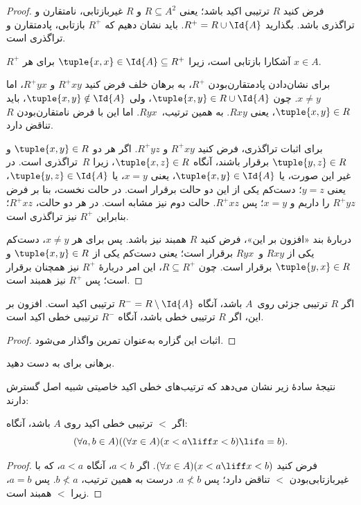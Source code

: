 \documentclass[../../../include/open-logic-section]{subfiles}
\begin{document}
\begin{proof}
فرض کنید $R$ ترتیبی اکید باشد؛ یعنی $R \subseteq A^2$ و $R$
غیربازتابی، نامتقارن و تراگذری باشد. بگذارید $R^+ = R \cup \Id{A}$.
باید نشان دهیم که $R^+$ بازتابی، پادمتقارن و تراگذری است.

$R^+$ آشکارا بازتابی است، زیرا $\tuple{x, x} \in \Id{A} \subseteq
R^+$ برای هر $x \in A$.

برای نشان‌دادن پادمتقارن‌بودن $R^+$، به برهان خلف فرض کنید $R^+xy$ و
$R^+yx$، اما $x \neq y$. چون $\tuple{x,y} \in R \cup \Id{A}$، ولی
$\tuple{x, y} \notin \Id{A}$، باید $\tuple{x, y} \in R$، یعنی
$Rxy$. به همین ترتیب،~$Ryx$. اما این با فرض نامتقارن‌بودن $R$ تناقض
دارد.

برای اثبات تراگذری، فرض کنید $R^+xy$ و $R^+yz$. اگر هر دو
$\tuple{x, y} \in R$ و $\tuple{y,z} \in R$ برقرار باشند، آنگاه $\tuple{x, z} \in
R$، زیرا $R$~تراگذری است. در غیر این صورت، یا $\tuple{x, y} \in
\Id{A}$، یعنی $x = y$، یا $\tuple{y, z} \in \Id{A}$، یعنی $y = z$؛
دست‌کم یکی از این دو حالت برقرار است.
در حالت نخست، بنا بر فرض $R^+yz$ را داریم و $x = y$؛ پس $R^+xz$. حالت
دوم نیز مشابه است. در هر دو حالت، $R^+xz$؛ بنابراین $R^+$ نیز تراگذری
است.

دربارهٔ بند «افزون بر این»، فرض کنید $R$ همبند نیز باشد. پس برای هر
$x \neq y$، دست‌کم یکی از $Rxy$ و~$Ryx$ برقرار است؛ یعنی دست‌کم یکی از
$\tuple{x, y} \in R$ و $\tuple{y, x} \in R$ برقرار است. چون $R \subseteq R^+$، این امر دربارهٔ $R^+$
نیز همچنان برقرار است؛ پس $R^+$ نیز همبند است.
\end{proof}

\begin{prop}
اگر $R$ ترتیبی جزئی روی~$A$ باشد، آنگاه $R^- = R \setminus \Id{A}$
ترتیبی اکید است. افزون بر این، اگر $R$ ترتیبی خطی باشد، آنگاه $R^-$
ترتیبی خطی اکید است.
\end{prop}

\begin{proof}
اثبات این گزاره به‌عنوان تمرین واگذار می‌شود.
\end{proof}

\begin{prob}
برهانی برای  به دست دهید.
\end{prob}

نتیجهٔ سادهٔ زیر نشان می‌دهد که ترتیب‌های خطی اکید خاصیتی شبیه اصل
گسترش دارند:

\begin{prop}
اگر $<$ ترتیبی خطی اکید روی $A$ باشد، آنگاه:
\[
  (\forall a, b \in A)((\forall x \in A)(x < a \liff x < b) \lif a = b).
\]
\end{prop}

\begin{proof}
فرض کنید $(\forall x \in A)(x < a \liff x < b)$. اگر $a < b$، آنگاه
$a <
a$، که با غیربازتابی‌بودن $<$ تناقض دارد؛ پس $a \nless b$. درست به
همین ترتیب، $b \nless a$. پس $a = b$، زیرا $<$ همبند است.
\end{proof}
\end{document}
